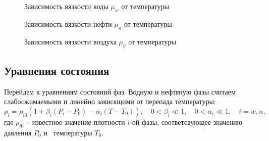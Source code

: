 \begin{figure}[h]
\begin{minipage}[h]{0.49\linewidth}
\caption{Зависимость вязкости воды $\mu_w$ от температуры}
\label{tikz_mu_w}
\end{minipage}
\hfill
\begin{minipage}[h]{0.49\linewidth}
\caption{Зависимость вязкости нефти $\mu_n$ от температуры}
\label{tikz_mu_n}
\end{minipage}
\end{figure}

\begin{figure}[h]
\begin{center}
\caption{Зависимость вязкости воздуха $\mu_g$ от температуры}
\label{tikz_mu_g}
\end{center}
\end{figure}

\subsection{Уравнения состояния}
Перейдем к уравнениям состояний фаз.
Водную и нефтяную фазы считаем слабосжимаемыми и линейно зависящими от перепада температуры:\\
$${\rho}_i = {\rho}_{i0} {(1 + {\beta}_i (P_i-P_0) - {\alpha}_i (T-T_0))},
{\quad}0<{\beta}_{i}{\ll}1,{\quad}0<{\alpha}_{i}{\ll}1,{\quad}i=w,n,$$
где ${\rho}_{i0}$ -- известное значение плотности $i$-ой фазы, соответсвующее
значению давления $P_0$ и~ температуры $T_0$.

